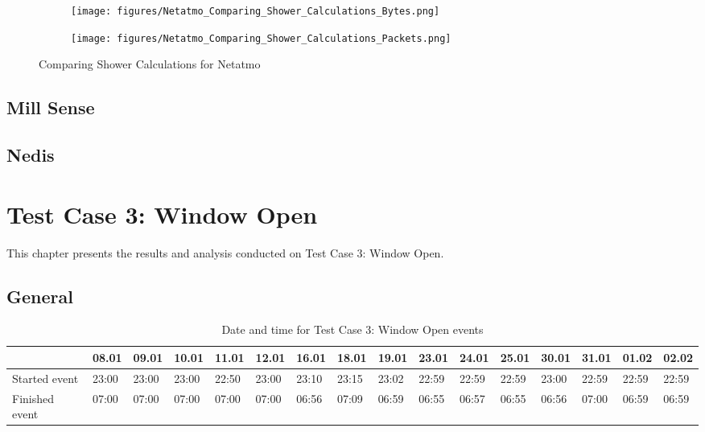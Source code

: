 \begin{figure}[H]
    \centering
    \begin{subfigure}{0.49\textwidth}
        \centering
        \texttt{[image: figures/Netatmo\_Comparing\_Shower\_Calculations\_Bytes.png]} 
    \end{subfigure}
    \begin{subfigure}{0.49\textwidth}
        \centering
        \texttt{[image: figures/Netatmo\_Comparing\_Shower\_Calculations\_Packets.png]} 
    \end{subfigure}
    \caption{Comparing Shower Calculations for Netatmo}
    \label{fig:NetatmoComparingShowerCalculations}
\end{figure}


\subsection{Mill Sense}
\subsection{Nedis}

\section{Test Case 3: Window Open}
This chapter presents the results and analysis conducted on Test Case 3: Window Open. 
\subsection{General}
\begin{table}[!hbtp]
    \centering
    \caption{Date and time for Test Case 3: Window Open events}
    \begin{adjustbox}{width=1\textwidth} 
            \begin{tabular}{l|l|l|l|l|l|l|l|l|l|l|l|l|l|l|l|}
                \cline{2-16}
                & 08.01 & 09.01 & 10.01 & 11.01 & 12.01 & 16.01 & 18.01 & 19.01 & 23.01 & 24.01 & 25.01 & 30.01 & 31.01 & 01.02 & 02.02 \\ \hline
                \multicolumn{1}{|l|}{Started event}  & 23:00 & 23:00 & 23:00 & 22:50 & 23:00 & 23:10 & 23:15 & 23:02 & 22:59 & 22:59 & 22:59 & 23:00 & 22:59 & 22:59 & 22:59 \\ \hline
                \multicolumn{1}{|l|}{Finished event} & 07:00 & 07:00 & 07:00 & 07:00 & 07:00 & 06:56 & 07:09 & 06:59 & 06:55 & 06:57 & 06:55 & 06:56 & 07:00 & 06:59 & 06:59 \\ \hline
            \end{tabular}
    \end{adjustbox}
    \label{tab:WindowDates}
\end{table}
